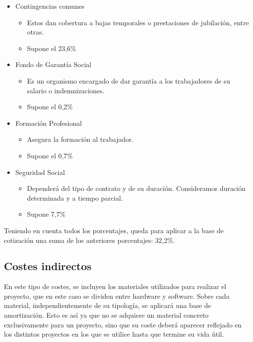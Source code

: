 \begin{itemize}
    \item Contingencias comunes
    \begin{itemize}
        \item Estos dan cobertura a bajas temporales o prestaciones de jubilación, entre otras.
        \item Supone el 23,6\%
    \end{itemize}
    \item Fondo de Garantía Social
    \begin{itemize}
        \item Es un organismo encargado de dar garantía a los trabajadores de su salario o indemnizaciones.
        \item Supone el 0,2\%
    \end{itemize}
    \item Formación Profesional
    \begin{itemize}
        \item Asegura la formación al trabajador.
        \item Supone el 0,7\%
    \end{itemize}
    \item Seguridad Social
    \begin{itemize}
        \item Dependerá del tipo de contrato y de su duración. Consideramos duración determinada y a tiempo parcial.
        \item Supone 7,7\%
    \end{itemize}
\end{itemize}

Teniendo en cuenta todos los porcentajes, queda para aplicar a la base de cotización una suma de los anteriores porcentajes: 32,2\%.

\subsection{Costes indirectos}
En este tipo de costes, se incluyen los materiales utilizados para realizar el proyecto, que en este caso se dividen entre hardware y software. Sobre cada material, independientemente de su tipología, se aplicará una base de amortización. Esto es así ya que no se adquiere un material concreto exclusivamente para un proyecto, sino que su coste deberá aparecer reflejado en los distintos proyectos en los que se utilice hasta que termine su vida útil.

